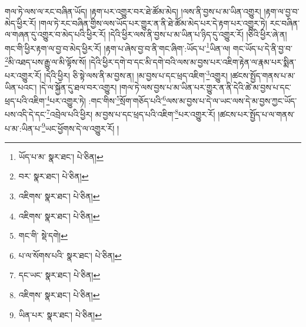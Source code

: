 གལ་ཏེ་ལས་ལ་རང་བཞིན་ཡོད། །རྟག་པར་འགྱུར་བར་ཐེ་ཚོམ་མེད། །ལས་ནི་བྱས་པ་མ་ཡིན་འགྱུར། །རྟག་ལ་བྱ་བ་མེད་ཕྱིར་རོ། །གལ་ཏེ་རང་བཞིན་གྱིས་ལས་ཡོད་པར་གྱུར་ན་ནི་ཐེ་ཚོམ་མེད་པར་དེ་རྟག་པར་འགྱུར་ཏེ། རང་བཞིན་ལ་གཞན་དུ་འགྱུར་བ་མེད་པའི་ཕྱིར་རོ། །དེའི་ཕྱིར་ལས་ནི་བྱས་པ་མ་ཡིན་པ་ཉིད་དུ་འགྱུར་རོ། །ཅིའི་ཕྱིར་ཞེ་ན། གང་གི་ཕྱིར་རྟག་ལ་བྱ་བ་མེད་ཕྱིར་རོ། །རྟག་པ་ཞེས་བྱ་བ་ནི་གང་ཞིག་:ཡོད་པ་\footnote{ཡོད་པ་མ་  སྣར་ཐང་།  པེ་ཅིན། }ཡིན་ལ། གང་ཡོད་པ་དེ་ནི་བྱ་བ་\footnote{བར་  སྣར་ཐང་།  པེ་ཅིན། }མི་འཐད་པས་རྒྱུ་ལ་མི་ལྟོས་སོ། །དེའི་ཕྱིར་དགེ་བ་དང་མི་དགེ་བའི་ལས་མ་བྱས་པར་འཇིག་རྟེན་ལ་རྣམ་པར་སྨིན་པར་འགྱུར་རོ། །དེའི་ཕྱིར། ཅི་སྟེ་ལས་ནི་མ་བྱས་ན། །མ་བྱས་པ་དང་ཕྲད་འཇིག་\footnote{འཇིགས་  སྣར་ཐང་།  པེ་ཅིན། }འགྱུར། །ཚངས་སྤྱོད་གནས་པ་མ་ཡིན་པའང་། །དེ་ལ་སྐྱོན་དུ་ཐལ་བར་འགྱུར། །གལ་ཏེ་ལས་བྱས་པ་མ་ཡིན་པར་གྱུར་ན་ནི་དེའི་ཚེ་མ་བྱས་པ་དང་ཕྲད་པའི་འཇིག་\footnote{འཇིགས་  སྣར་ཐང་།  པེ་ཅིན། }པར་འགྱུར་ཏེ། :གང་གིས་\footnote{གང་གི་  སྡེ་དགེ། }སྲོག་གཅོད་པའི་\footnote{པ་ལ་སོགས་པའི་  སྣར་ཐང་།  པེ་ཅིན། }ལས་མ་བྱས་པ་དེ་ལ་ཡང་ལས་དེ་མ་བྱས་ཀྱང་ཡོད་པས་འདི་དེ་དང་\footnote{དང་ཡང་  སྣར་ཐང་།  པེ་ཅིན། }འབྲེལ་པའི་ཕྱིར། མ་བྱས་པ་དང་ཕྲད་པའི་འཇིག་\footnote{འཇིགས་  སྣར་ཐང་།  པེ་ཅིན། }པར་འགྱུར་རོ། །ཚངས་པར་སྤྱོད་པ་ལ་གནས་པ་མ་:ཡིན་པ་\footnote{ཡིན་པར་  སྣར་ཐང་།  པེ་ཅིན། }ཡང་ཕྱོགས་དེ་ལ་འགྱུར་རོ། །
